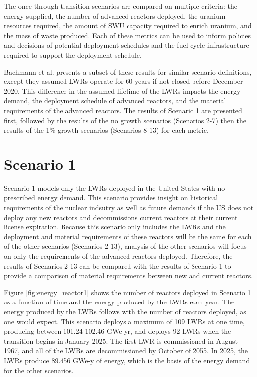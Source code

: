 The once-through transition scenarios are compared on multiple 
criteria: the energy supplied, the number of advanced reactors deployed, 
the uranium resources required, the amount of \gls{SWU} capacity required 
to enrich uranium,
and the mass of waste produced. Each of these metrics can be used to inform 
policies and decisions of potential deployment schedules and the 
fuel cycle infrastructure required to support the deployment schedule. 

Bachmann et al. \cite{bachmann_enrichment_2021} presents a subset of 
these results for similar scenario definitions, except they assumed \glspl{LWR} 
operate for 60 years if not closed before December 2020. This difference in 
the assumed lifetime of the \glspl{LWR} impacts the energy demand, 
the deployment schedule of advanced reactors, and the material 
requirements of the advanced reactors. The results of Scenario 
1 are presented first, followed by the results of the no growth scenarios 
(Scenarios 2-7) then the results of the 1\% growth scenarios (Scenarios 8-13)
for each metric. 

\section{Scenario 1}
Scenario 1 models only the \glspl{LWR} deployed in the United States with no 
prescribed energy demand. This scenario provides insight on historical 
requirements of the nuclear indsutry as well as future demands if the 
US does not deploy any new reactors and decommissions current reactors at their 
current license expiration. 
Because this scenario only includes the \glspl{LWR} and the 
deployment and material requirements of these reactors will be the same 
for each of the other scenarios (Scenarios 2-13), analysis 
of the other scenarios will focus on only the requirements of 
the advanced reactors deployed. Therefore, the results of Scenarios 2-13 can 
be compared with the results of Scenario 1 to provide a comparison 
of material requirements between new and current reactors. 

Figure \ref{fig:energy_reactor1} shows the number of 
reactors deployed in Scenario 1 as a function of time and the energy 
produced by the \glspl{LWR} each year. The energy produced by the 
\glspl{LWR} follows with the number of reactors deployed, as 
one would expect. This scenario deploys a maximum of 109 
\glspl{LWR} at one time, producing 
between 101.24-102.46 GWe-yr, and deploys 92 \glspl{LWR}
when the transition begins in January 2025. The first \gls{LWR} is 
commissioned in August 1967, and all of the \glspl{LWR} are
decommissioned by October of 2055. In 2025, the \glspl{LWR} produce 
89.456 GWe-y of energy, which is the basis of the energy demand for 
the other scenarios. 

